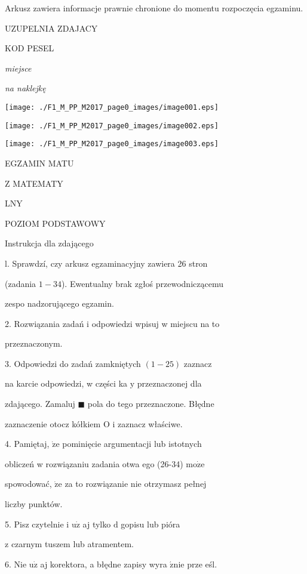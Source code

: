 \documentclass[a4paper,12pt]{article}
\begin{document}
Arkusz zawiera informacje prawnie chronione do momentu rozpoczęcia egzaminu.

UZUPELNIA ZDAJACY

KOD PESEL

{\it miejsce}

{\it na naklejkę}
\begin{center}
\texttt{[image: ./F1\_M\_PP\_M2017\_page0\_images/image001.eps]}

\texttt{[image: ./F1\_M\_PP\_M2017\_page0\_images/image002.eps]}

\texttt{[image: ./F1\_M\_PP\_M2017\_page0\_images/image003.eps]}
\end{center}
EGZAMIN MATU

Z MATEMATY

LNY

POZIOM PODSTAWOWY

Instrukcja dla zdającego

l. Sprawdzí, czy arkusz egzaminacyjny zawiera 26 stron

(zadania $1-34$). Ewentualny brak zgłoś przewodniczącemu

zespo nadzorującego egzamin.

2. Rozwiązania zadań i odpowiedzi wpisuj w miejscu na to

przeznaczonym.

3. Odpowiedzi do zadań zamkniętych $(1-25)$ zaznacz

na karcie odpowiedzi, w części ka $\mathrm{y}$ przeznaczonej dla

zdającego. Zamaluj $\blacksquare$ pola do tego przeznaczone. Błędne

zaznaczenie otocz kółkiem $\mathrm{O}$ i zaznacz właściwe.

4. Pamiętaj, $\dot{\mathrm{z}}\mathrm{e}$ pominięcie argumentacji lub istotnych

obliczeń w rozwiązaniu zadania otwa ego (26-34) $\mathrm{m}\mathrm{o}\dot{\mathrm{z}}\mathrm{e}$

spowodować, $\dot{\mathrm{z}}\mathrm{e}$ za to rozwiązanie nie otrzymasz pełnej

liczby punktów.

5. Pisz czytelnie i $\mathrm{u}\dot{\mathrm{z}}$ aj tylko $\mathrm{d}$ gopisu lub pióra

z czarnym tuszem lub atramentem.

6. Nie $\mathrm{u}\dot{\mathrm{z}}$ aj korektora, a błędne zapisy wyra $\acute{\mathrm{z}}\mathrm{n}\mathrm{i}\mathrm{e}$ prze eśl.
\end{document}
